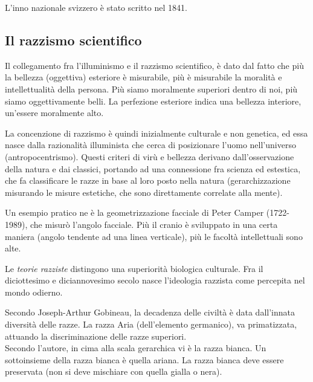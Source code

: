 \documentclass[a4paper]{article}
\begin{document}
L'inno nazionale svizzero è stato scritto nel 1841.

\subsection{Il razzismo scientifico}


Il collegamento fra l'illuminismo e il razzismo scientifico, è dato dal fatto che più
la bellezza (oggettiva) esteriore è misurabile, più è misurabile la moralità e intellettualità della persona.
Più siamo moralmente superiori dentro di noi, più siamo oggettivamente belli.
La perfezione esteriore indica una bellezza interiore, un'essere moralmente alto.

La concenzione di razzismo è quindi inizialmente culturale e non genetica,
ed essa nasce dalla razionalità illuminista che cerca di posizionare l'uomo nell'universo (antropocentrismo).
Questi criteri di virù e bellezza derivano dall'osservazione della natura e dai classici,
portando ad una connessione fra scienza ed estestica, che fa classificare le razze
in base al loro posto nella natura (gerarchizzazione misurando le misure estetiche, che
sono direttamente correlate alla mente).

Un esempio pratico ne è la geometrizzazione facciale di Peter Camper (1722-1989),
che misurò l'angolo facciale. Più il cranio è sviluppato in una certa maniera (angolo tendente ad una linea verticale),
più le facoltà intellettuali sono alte.


Le \textit{teorie razziste} distingono una superiorità biologica culturale.
Fra il diciottesimo e diciannovesimo secolo nasce l'ideologia razzista come percepita nel mondo odierno.

Secondo Joseph-Arthur Gobineau, la decadenza delle civiltà è data dall'innata
diversità delle razze. La razza Aria (dell'elemento germanico),
va primatizzata, attuando la discriminazione delle razze superiori.\\
Secondo l'autore, in cima alla scala gerarchica vi è la razza bianca.
Un sottoinsieme della razza bianca è quella ariana.
La razza bianca deve essere preservata (non si deve mischiare con quella gialla o nera).
\end{document}
